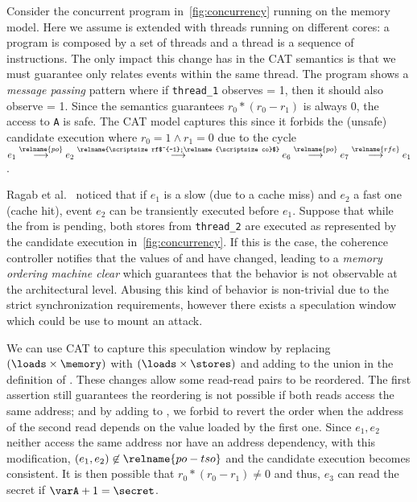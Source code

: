 \documentclass[conference]{IEEEtran}
\begin{document}
Consider the concurrent program in~\autoref{fig:concurrency} running on the \tso memory model.
Here we assume \masm is extended with threads running on different cores: a program is composed by a set of threads and a thread is a sequence of instructions.
The only impact this change has in the CAT semantics is that we must guarantee  only relates events within the same thread.
The program shows a \emph{message passing} pattern where if \texttt{thread\_1} observes \varx = 1, then it should also observe \vary = 1.
Since the \tso semantics guarantees $r_0*(r_0-r_1)$ is always 0, the access to {\color{mygreen} \texttt{A}} is safe.
The CAT model captures this since it forbids the (unsafe) candidate execution where $r_0 = 1 \land r_1 = 0$ due to the cycle $e_1 \stackrel{\relname{\scriptsize po}}{\longrightarrow} e_2 \stackrel{\relname{\scriptsize rf$^{-1};\relname{\scriptsize co}$}}{\longrightarrow} e_6 \stackrel{\relname{\scriptsize po}}{\longrightarrow} e_7 \stackrel{\relname{\scriptsize rfe}}{\longrightarrow} e_1$.

Ragab et al.~\cite{ragab_rage_2021} noticed that if $e_1$ is a slow \load (due to a cache miss) and $e_2$ a fast one (cache hit), event $e_2$ can be transiently executed before $e_1$.
Suppose that while the \load from \varx is pending, both stores from \texttt{thread\_2} are executed as represented by the candidate execution in~\autoref{fig:concurrency}.
If this is the case, the coherence controller notifies that the values of \varx and \vary have changed, leading to a \emph{memory ordering machine clear} which guarantees that the behavior is not observable at the architectural level.
Abusing this kind of behavior is non-trivial due to the strict synchronization requirements, however there exists a speculation window which could be use to mount an attack.

We can use CAT to capture this speculation window by replacing $(\loads \times \memory)$ with $(\loads \times \stores)$ and adding  to the union in the definition of .
These changes allow some read-read pairs to be reordered.
The first assertion still guarantees the reordering is not possible if both reads access the same address; and by adding  to , we forbid to revert the order when the address of the second read depends on the value loaded by the first one.
Since $e_1, e_2$ neither access the same address nor have an address dependency, with this modification, $(e_1,e_2) \not \in \relname{po-tso}$ and the candidate execution becomes consistent.
It is then possible that $r_0*(r_0-r_1) \not = 0$ and thus, $e_3$ can read the secret if $\varA + 1 = \secret$.
\end{document}
